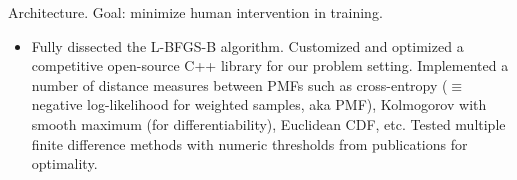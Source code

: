 \documentclass[aspectratio=169]{beamer}
\begin{document}
\begin{frame}{\normalsize Architecture. Goal: minimize human intervention in training.}
\begin{textblock}{7.9}
\begin{enumerate}
\begin{itemize}
\tiny\item Fully dissected the L-BFGS-B algorithm. Customized and optimized a competitive open-source C++ library for our problem setting. Implemented a number of distance measures between PMFs such as cross-entropy ($\equiv$ negative log-likelihood for weighted samples, aka PMF), Kolmogorov with smooth maximum (for differentiability), Euclidean CDF, etc.  Tested multiple finite difference methods with numeric thresholds from publications for optimality.\smallskip
 
\end{itemize}
\end{enumerate}
\end{textblock}
\end{frame}

\end{document}
